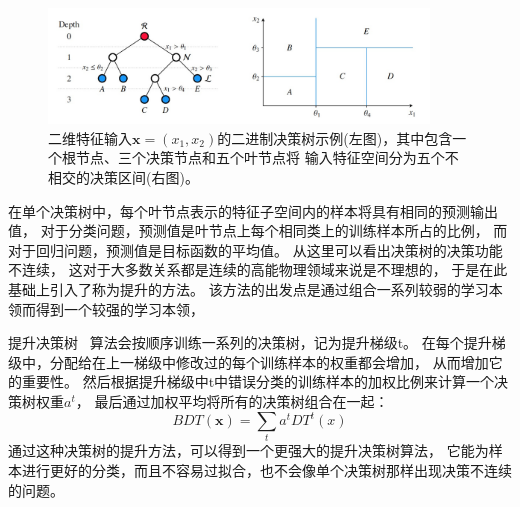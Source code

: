 \begin{figure}
  \begin{center}
    \includegraphics[width=0.9\textwidth]{figuresTHE/BDT.jpg}
  \end{center}
  \caption{二维特征输入$\boldsymbol{x}=(x_1,x_2)$的二进制决策树示例(左图)，其中包含一个根节点、三个决策节点和五个叶节点将
  输入特征空间分为五个不相交的决策区间(右图)。 }
    \label{fig:BDT}
\end{figure}

在单个决策树中，每个叶节点表示的特征子空间内的样本将具有相同的预测输出值，
对于分类问题，预测值是叶节点上每个相同类上的训练样本所占的比例，
而对于回归问题，预测值是目标函数的平均值。
从这里可以看出决策树的决策功能不连续，
这对于大多数关系都是连续的高能物理领域来说是不理想的，
于是在此基础上引入了称为提升的方法。
该方法的出发点是通过组合一系列较弱的学习本领而得到一个较强的学习本领，

提升决策树
~\cite{BDT3,BDT4}算法会按顺序训练一系列的决策树，记为提升梯级t。
在每个提升梯级中，分配给在上一梯级中修改过的每个训练样本的权重都会增加，
从而增加它的重要性。
然后根据提升梯级中t中错误分类的训练样本的加权比例来计算一个决策树权重$a^t$，
最后通过加权平均将所有的决策树组合在一起：
\begin{equation} 
\label{eq:BDT}
BDT(\boldsymbol{x})=\sum_t a^t DT^t(x) 	
\end{equation}
通过这种决策树的提升方法，可以得到一个更强大的提升决策树算法，
它能为样本进行更好的分类，而且不容易过拟合，也不会像单个决策树那样出现决策不连续的问题。

































